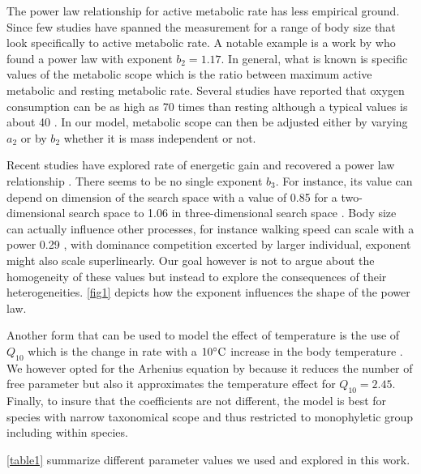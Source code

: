The power law relationship for active metabolic rate has less empirical ground.
Since few studies have spanned the measurement for a range of body size that look specifically to active metabolic rate.
A notable example is a work by \citet{Bartholomew1978} who found a power law with exponent $b_2 = 1.17$.
In general, what is known is specific values of the metabolic scope which is the ratio between maximum active metabolic and resting metabolic rate.
Several studies have reported that oxygen consumption can be as high as 70 times than resting although a typical values is about 40 \citep{Bartholomew1981}.  
In our model, metabolic scope can then be adjusted either by varying $a_2$  or by $b_2$ whether it is mass independent or not. 

Recent studies have explored rate of energetic gain and recovered a power law relationship \citep{Maino2015, Pawar2012}.
There seems to be no single exponent $b_3$.
For instance, its value can depend on dimension of the search space with a value of 0.85 for a two-dimensional search space to 1.06 in three-dimensional search space \citep{Pawar2012}.
Body size can actually influence other processes, for instance walking speed  can scale with a power 0.29 \citep{Peters1986}, with dominance competition excerted by larger individual, exponent might also scale superlinearly.
Our goal however is not to argue about the homogeneity of these values but instead to explore the consequences of their heterogeneities.
\cref{fig1} depicts how the exponent influences the shape of the power law.

Another form that can be used to model the effect of temperature is the use of $Q_{10}$ which is the change in rate with a $10^ {\circ} \rm{C}$ increase in the body temperature \citep{Precht1973}.
We however opted for the Arhenius equation by \citet{Brown2004} because it reduces the number of free parameter but also it approximates the temperature effect for $Q_{10} = 2.45$.  
Finally, to  insure that the coefficients are not different, the model is best for species with narrow taxonomical scope and thus restricted to monophyletic group including within species. 

\cref{table1} summarize different parameter values we used and explored in this work.

